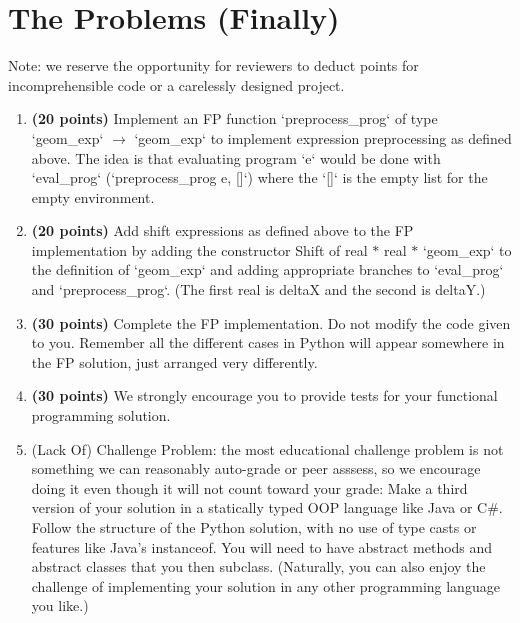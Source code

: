 \documentclass[a4paper,12pt]{article}
\begin{document}
\section*{The Problems (Finally)}
Note: we reserve the opportunity for reviewers to deduct points for incomprehensible code or a carelessly designed project.
\begin{enumerate}
  \item \textbf{(20 points)} Implement an FP function `preprocess\_prog` of type `geom\_exp` $\rightarrow$ `geom\_exp` to implement expression preprocessing as defined above. The idea is that evaluating program `e` would be done with `eval\_prog` (`preprocess\_prog e, []`) where the `[]` is the empty list for the empty environment.

  \item \textbf{(20 points)} Add shift expressions as defined above to the FP implementation by adding the constructor Shift of real $*$ real $*$ `geom\_exp` to the definition of `geom\_exp` and adding appropriate branches to `eval\_prog` and `preprocess\_prog`. (The first real is deltaX and the second is deltaY.)

  \item \textbf{(30 points)} Complete the FP implementation. Do not modify the code given to you. Remember all the different cases in Python will appear somewhere in the FP solution, just arranged very differently.

  \item \textbf{(30 points)} We strongly encourage you to provide tests for your functional programming solution.

  \item (Lack Of) Challenge Problem: the most educational challenge problem is not something we can reasonably auto-grade or peer asssess, so we encourage doing it even though it will not count toward your grade: Make a third version of your solution in a statically typed OOP language like Java or C\#. Follow the structure of the Python solution, with no use of type casts or features like Java's instanceof. You will need to have abstract methods and abstract classes that you then subclass. (Naturally, you can also enjoy the challenge of implementing your solution in any other programming language you like.)
\end{enumerate}
\end{document}
